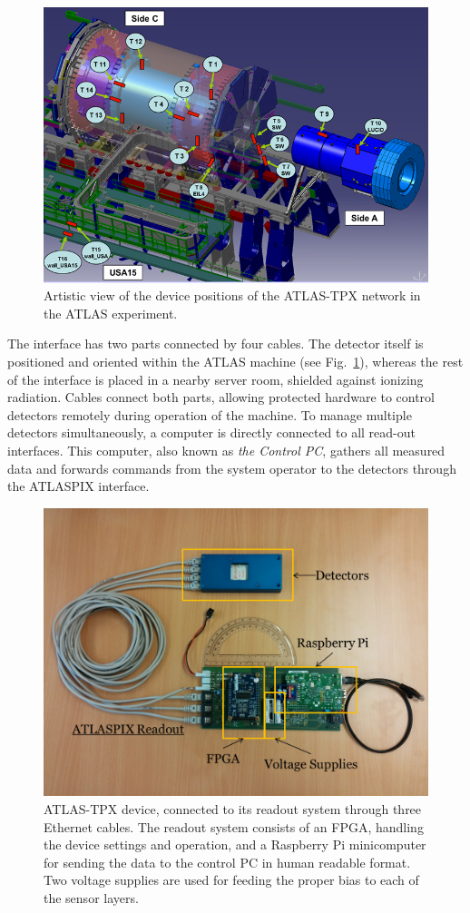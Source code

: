\documentclass[journal]{IEEEtran}
\begin{document}
\begin{figure}[tbp]
	\centering
        \includegraphics[clip, width=.45\textwidth, angle = 0 ]{Plots/ATLASTPX.png}
      \caption {Artistic view of the device positions of the ATLAS-TPX network in the ATLAS experiment.}
    \label{fig:positions}
\end{figure}

The interface has two parts connected by four cables. The detector itself is positioned and oriented within the ATLAS machine (see Fig.~\ref{fig:positions}), whereas the rest of the interface is placed in a nearby server room, shielded against ionizing radiation. Cables connect both parts, allowing protected hardware to control detectors remotely during operation of the machine. To manage multiple detectors simultaneously, a computer is directly connected to all read-out interfaces. This computer, also known as \textit{the Control PC}, gathers all measured data and forwards commands from the system operator to the detectors through the ATLASPIX interface.

\begin{figure}[tbp]
	\centering
        \includegraphics[clip,width=.45\textwidth, angle = 0 ]{Plots/ATLASPIX.png}
      \caption {ATLAS-TPX device, connected to its readout system through three Ethernet cables. The readout system consists of an FPGA, handling the device settings and operation, and a Raspberry Pi minicomputer for sending the data to the control PC in human readable format. Two voltage supplies are used for feeding the proper bias to each of the sensor layers.}
    \label{fig:device_with_readout}
\end{figure}
\end{document}
